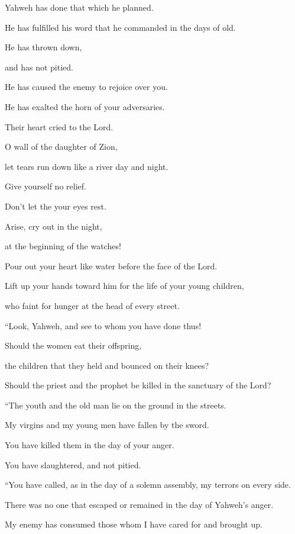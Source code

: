 {\par }{\BB \par }{\Q {}Yahweh has done that which he planned.
\par }{\QB He has fulfilled his word that he commanded in the days of old.
\par }{\Q He has thrown down,
\par }{\QB and has not pitied.
\par }{\Q He has caused the enemy to rejoice over you.
\par }{\QB He has exalted the horn of your adversaries.
\par }{\BB \par }{\Q {}Their heart cried to the Lord.
\par }{\QB O wall of the daughter of Zion,
\par }{\QB let tears run down like a river day and night.
\par }{\Q Give yourself no relief.
\par }{\QB Don’t let the your eyes rest.
\par }{\BB \par }{\Q {}Arise, cry out in the night,
\par }{\QB at the beginning of the watches!
\par }{\Q Pour out your heart like water before the face of the Lord.
\par }{\QB Lift up your hands toward him for the life of your young children,
\par }{\QB who faint for hunger at the head of every street.
\par }{\BB \par }{\Q {}“Look, Yahweh, and see to whom you have done thus!
\par }{\QB Should the women eat their offspring,
\par }{\QB the children that they held and bounced on their knees?
\par }{\QB Should the priest and the prophet be killed in the sanctuary of the Lord?
\par }{\BB \par }{\Q {}“The youth and the old man lie on the ground in the streets.
\par }{\QB My virgins and my young men have fallen by the sword.
\par }{\Q You have killed them in the day of your anger.
\par }{\QB You have slaughtered, and not pitied.
\par }{\BB \par }{\Q {}“You have called, as in the day of a solemn assembly, my terrors on every side.
\par }{\QB There was no one that escaped or remained in the day of Yahweh’s anger.
\par }{\QB My enemy has consumed those whom I have cared for and brought up.

}

